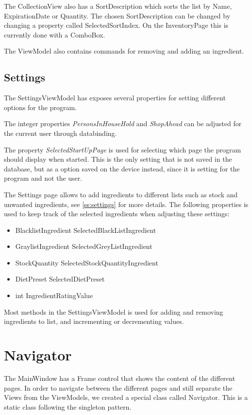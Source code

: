 The CollectionView also has a SortDescription which sorts the list by Name, ExpirationDate or Quantity. The chosen SortDescription can be changed by changing a property called SelectedSortIndex. On the InventoryPage this is currently done with a ComboBox.

The ViewModel also contains commands for removing and adding an ingredient.

\section{Settings}
The SettingsViewModel has exposes several properties for setting different options for the program.

The integer properties \textit{PersonsInHouseHold} and \textit{ShopAhead} can be adjusted for the current user through databinding.

The property \textit{SelectedStartUpPage} is used for selecting which page the program should display when started. This is the only setting that is not saved in the database, but as a option saved on the device instead, since it is setting for the program and not the user.

The Settings page allows to add ingredients to different lists such as stock and unwanted ingredients, see \cref{ss:settings} for more details.
The following properties is used to keep track of the selected ingredients when adjusting these settings:
\begin{itemize}
	\item BlacklistIngredient SelectedBlackListIngredient
	\item GraylistIngredient SelectedGreyListIngredient 
	\item StockQuantity SelectedStockQuantityIngredient
	\item DietPreset SelectedDietPreset
	\item int IngredientRatingValue
\end{itemize}

Most methods in the SettingsViewModel is used for adding and removing ingredients to list, and incrementing or decrementing values.

\chapter{Navigator}
The MainWindow has a Frame control that shows the content of the different pages. In order to navigate between the different pages and still separate the Views from the ViewModels, we created a special class called Navigator. This is a static class following the singleton pattern. 

